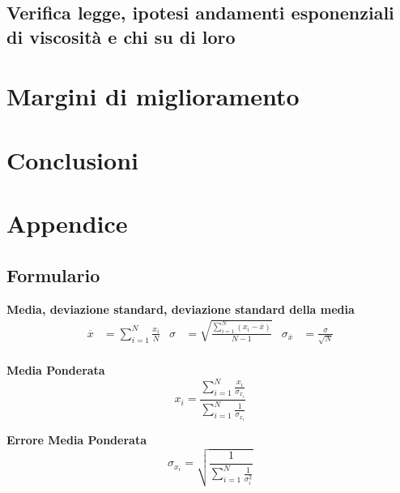 \documentclass[a4paper,11pt,oneside]{article}
\begin{document}
\subsection*{Verifica legge, ipotesi andamenti esponenziali di viscosità e chi su di loro}




\section{Margini di miglioramento}


\section{Conclusioni}

\section{Appendice}

\subsection{Formulario}
\textbf{Media, deviazione standard, deviazione standard della media}
\begin{align*}
        \overline{x}&=\sum\limits_{i=1}^{N} \frac{x_{i}}{N}&
        \sigma&=\sqrt{\frac{\sum\limits_{i=1}^{N} (x_{i}-\overline{x})}{N-1}}&
        \sigma_{\overline{x}}&=\frac{\sigma}{\sqrt{N}}
\end{align*}\\

\textbf{Media Ponderata}
\begin{equation*}
\label{eq:media_pond}
    x_i=\frac{\sum_{i=1}^{N}\frac{x_i}{\sigma_{x_i}}}{\sum_{i=1}^{N}\frac{1}{\sigma_{x_i}}}
\end{equation*}

\textbf{Errore Media Ponderata}
\begin{equation*}
\label{eq:errore_media_pond}
     \sigma_{x_i}=\sqrt{\frac{1}{\sum_{i=1}^{N}\frac{1}{\sigma_{i}^{2}}}}
\end{equation*}
\end{document}
